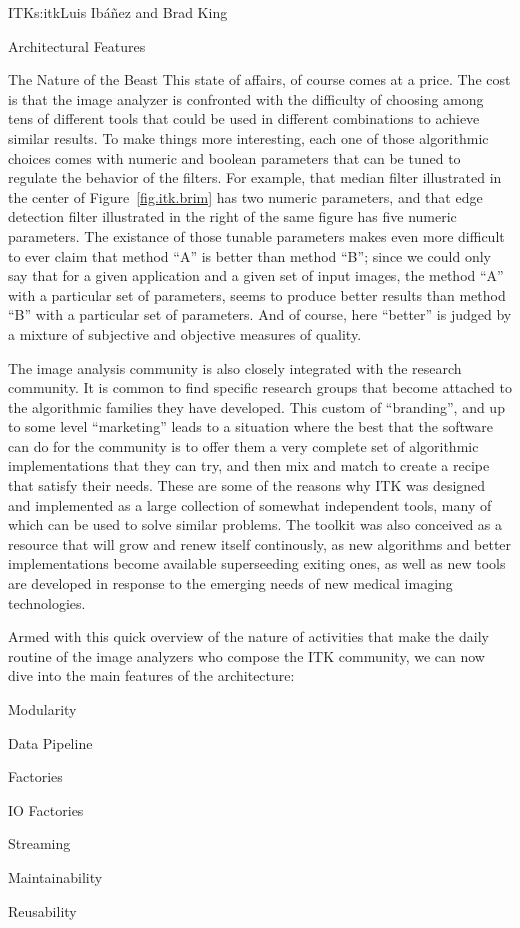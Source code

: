 \begin{aosachapter}{ITK}{s:itk}{Luis Ib\'{a}\~{n}ez and Brad King}
\begin{aosasect1}{Architectural Features}
\begin{aosasect2}{The Nature of the Beast}
This state of affairs, of course comes at a price. The cost is that the image
analyzer is confronted with the difficulty of choosing among tens of different
tools that could be used in different combinations to achieve similar results.
To make things more interesting, each one of those algorithmic choices comes
with numeric and boolean parameters that can be tuned to regulate the behavior
of the filters. For example, that median filter illustrated in the center of
Figure~\ref{fig.itk.brim} has two numeric parameters, and that edge detection
filter illustrated in the right of the same figure has five numeric parameters.
The existance of those tunable parameters makes even more difficult to ever
claim that method ``A'' is better than method ``B''; since we could only say
that for a given application and a given set of input images, the method ``A''
with a particular set of parameters, seems to produce better results than
method ``B'' with a particular set of parameters.  And of course, here
``better'' is judged by a mixture of subjective and objective measures of
quality.

The image analysis community is also closely integrated with the research
community. It is common to find specific research groups that become attached
to the algorithmic families they have developed. This custom of ``branding'',
and up to some level ``marketing'' leads to a situation where the best that the
software can do for the community is to offer them a very complete set of
algorithmic implementations that they can try, and then mix and match to create
a recipe that satisfy their needs. These are some of the reasons why ITK was
designed and implemented as a large collection of somewhat independent tools,
many of which can be used to solve similar problems. The toolkit was also
conceived as a resource that will grow and renew itself continously, as new
algorithms and better implementations become available superseeding exiting
ones, as well as new tools are developed in response to the emerging needs of
new medical imaging technologies.

Armed with this quick overview of the nature of activities that make the daily
routine of the image analyzers who compose the ITK community, we can now dive
into the main features of the architecture:

\begin{aosaitemize}
\item Modularity
\item Data Pipeline
\item Factories
\item IO Factories
\item Streaming
\item Maintainability
\item Reusability
\end{aosaitemize}


\end{aosasect2}
\end{aosasect1}
\end{aosachapter}
